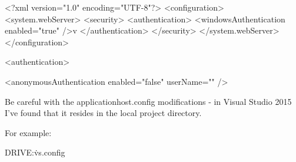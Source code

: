 <?xml version="1.0" encoding="UTF-8"?>
<configuration>
    <system.webServer>
      <security>
        <authentication>
          <windowsAuthentication enabled="true" />v
        </authentication>
      </security>
    </system.webServer>
</configuration>

<authentication>

            <anonymousAuthentication enabled="false" userName="" />
			
Be careful with the applicationhost.config modifications - in Visual Studio 2015 I've found that it
resides in the local project directory.

For example:

DRIVE:\MYPROJECT\.vs\config\applicationhost.config
